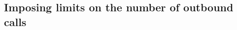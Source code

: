 \begin{comment}
The routing policy is configured to be agents' preference-based,
and a matrix of ranks is specified for contact selection only.
The other required matrix is then inferred by transposing the given
matrix.
When an inbound call arrives, inbound-only agents have priority
over blend agents to serve the call since they are more efficient at
this task.  As a result, in column~0 of the matrix of ranks, representing priorities
for call type~0 (first inbound type), element at row~0, representing
the inbound-only agent group,
has a lower rank than element at row~2, which represents the first blend agent group.
Column~1 (for call type~1, i.e.,
second inbound type) is similar to column~0, except that agent group~3
is used instead of agent group~2.
When an outbound call succeeds, outbound-only agents have priority
over blend agents to serve it.  This is modeled similarly to the case
of inbound calls, in the
columns~2 and~3 of the matrix of ranks.

Contact selection, in contrast with agent selection, enables some
dynamic aspects.
When an inbound-only agent becomes free or starts its shift, it
chooses the inbound call with the longest waiting time in queue.
The longest waiting time is used since the priorities (elements in
row~0) are set to~1 for both call types.
The same contact selection rule is used for the outbound-only
agents, as
shown in row~1 of the matrix.
However, when a blend agent becomes free or starts its shift, it looks
for an outbound call first.
If there is no waiting outbound call it can serve, which should be the
most frequent case, the blend agent
then looks for an inbound call it can serve.
This is modeled in row~2 of the matrix of ranks with columns having
different values.  The router gives priority to the lowest ranks,
i.e., free agents in group~3 get calls of type~2 (first outbound type)
before calls of type~0 (first inbound type).
Row~3 of the matrix is similar to row~2, with different columns having
finite values.

One could extend this example to use weighted waiting times by
specifying a \texttt{weightsGT} matrix.
For example, one could increase the weight of contact type 0 to
increase its priority.
Note that only the two first rows of the matrix of weights would have an
effect as the blend agents use priority queue due to the matrix of ranks
specified above.
\end{comment}

\subsection{Imposing limits on the number of outbound calls}

